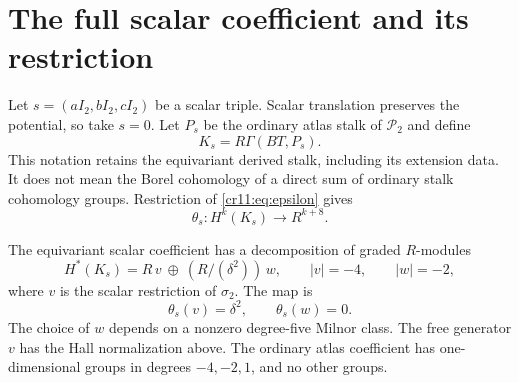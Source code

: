 \section{The full scalar coefficient and its restriction}
\label{cr11:sec:scalar}

Let $s=(aI_2,bI_2,cI_2)$ be a scalar triple.
Scalar translation preserves the potential, so take $s=0$.
Let $P_s$ be the ordinary atlas stalk of $\mathcal P_2$ and define
\[
 K_s=R\Gamma(BT,P_s).
\]
This notation retains the equivariant derived stalk, including its
extension data. It does not mean the Borel cohomology of a direct
sum of ordinary stalk cohomology groups.
Restriction of \eqref{cr11:eq:epsilon} gives
\[
 \theta_s:H^k(K_s)\longrightarrow R^{k+8}.
\]

\begin{theorem}
\label{cr11:thm:scalar}
The equivariant scalar coefficient has a decomposition of graded
$R$-modules
\begin{equation}
 H^*(K_s)=R\,v\ \oplus\ (R/(\delta^2))\,w,
 \qquad |v|=-4,\qquad |w|=-2,
 \label{cr11:eq:scalar-module}
\end{equation}
where $v$ is the scalar restriction of $\sigma_2$.
The map is
\begin{equation}
 \theta_s(v)=\delta^2,\qquad \theta_s(w)=0.
 \label{cr11:eq:scalar-map}
\end{equation}
The choice of $w$ depends on a nonzero degree-five Milnor class.
The free generator $v$ has the Hall normalization above.
The ordinary atlas coefficient has one-dimensional groups in degrees
$-4,-2,1$, and no other groups.
\end{theorem}

